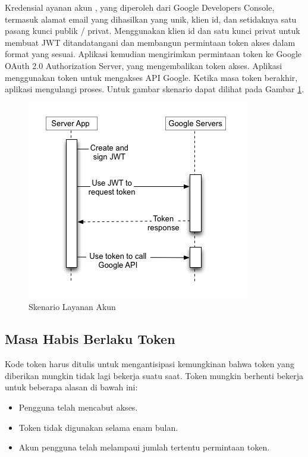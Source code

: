 Kredensial ayanan akun , yang diperoleh dari Google Developers Console, termasuk alamat email yang dihasilkan yang unik, klien id, dan setidaknya satu pasang kunci publik / privat. Menggunakan klien id dan satu kunci privat untuk membuat JWT ditandatangani dan membangun permintaan token akses dalam format yang sesuai. Aplikasi kemudian mengirimkan permintaan token ke Google OAuth 2.0 Authorization Server, yang mengembalikan token akses. Aplikasi menggunakan token untuk mengakses API Google. Ketika masa token berakhir, aplikasi mengulangi proses. Untuk gambar skenario dapat dilihat pada Gambar \ref{fig:skenariolayananakun}.

\begin{figure}[H]
\centering
\includegraphics[scale=1]{Gambar/skenario4.png}
\caption[Gambar Skenario Layanan Akun]{Skenario Layanan Akun}
\label{fig:skenariolayananakun}
\end{figure}

\subsection{Masa Habis Berlaku Token}
Kode token harus ditulis untuk mengantisipasi kemungkinan bahwa token yang diberikan mungkin tidak lagi bekerja suatu saat. Token mungkin berhenti bekerja untuk beberapa alasan di bawah ini:

\begin{itemize}
\item
Pengguna telah mencabut akses.
\item
Token tidak digunakan selama enam bulan.
\item
Akun pengguna telah melampaui jumlah tertentu permintaan token.
\end{itemize}

